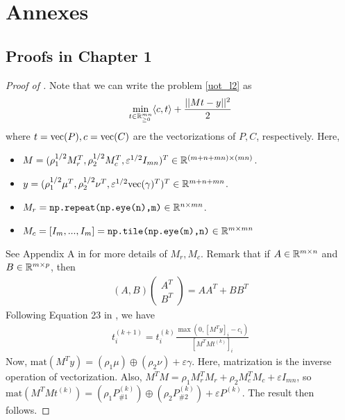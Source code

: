 \chapter[Annexes]{Annexes}

\localtableofcontents



\section{Proofs in Chapter 1}

\begin{proof}[Proof of ]
Note that we can write the problem \ref{uot_l2} as
\begin{align}
    \min_{t \in \mathbb R^{mn}_{\geq 0}} \langle c, t \rangle + \frac{|| Mt - y ||^2}{2}
\end{align}
where $t = \text{vec}(P), c = \text{vec}(C)$ are the vectorizations of $P, C$, respectively. Here,
\begin{itemize}
    \item $M = (\rho_1^{1/2} M_r^T, \rho_2^{1/2} M_c^T, \varepsilon^{1/2} I_{mn})^T \in \mathbb R^{(m + n + mn) \times (mn)}$.

    \item $y = (\rho_1^{1/2} \mu^T, \rho_2^{1/2} \nu^T, \varepsilon^{1/2} \text{vec}(\gamma)^T)^T \in \mathbb R^{m + n + mn}$.

    \item $M_r = \texttt{np.repeat(np.eye(n),m)} \in \mathbb R^{n \times mn}$.

    \item $M_c = [I_m, ..., I_m] = \texttt{np.tile(np.eye(m),n)} \in \mathbb R^{m \times mn}$
\end{itemize}
See Appendix A in \citep{Chapel21} for more details of $M_r, M_c$.
Remark that if $A \in \mathbb R^{m \times n}$ and $B \in \mathbb R^{m \times p}$, then
\begin{align}
    (A, B) \begin{pmatrix}
        A^T \\
        B^T
    \end{pmatrix}
    = A A^T + B B^T
\end{align}
Following Equation 23 in \citep{Chapel21},  we have
\begin{align}
    t^{(k+1)}_i = t^{(k)}_i \frac{\max( 0, [M^T y]_i - c_i)}{[M^T M t^{(k)}]_i}
\end{align}
Now, $\text{mat}(M^T y) = (\rho_1 \mu) \oplus (\rho_2 \nu) + \varepsilon \gamma$.
Here, matrization is the inverse operation of vectorization. Also,
$M^T M = \rho_1 M_r^T M_r + \rho_2 M_c^T M_c + \varepsilon I_{mn}$, so
$\text{mat}(M^T M t^{(k)}) = (\rho_1 P_{\# 1}^{(k)}) \oplus (\rho_2 P_{\# 2}^{(k)})
+ \varepsilon P^{(k)} $. The result then follows.
\end{proof}

